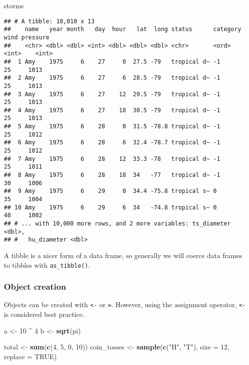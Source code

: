 \documentclass[
]{article}
\newenvironment{Shaded}{\begin{snugshade}}{\end{snugshade}}
\newcommand{\DataTypeTok}[1]{\textcolor[rgb]{0.13,0.29,0.53}{#1}}
\newcommand{\DecValTok}[1]{\textcolor[rgb]{0.00,0.00,0.81}{#1}}
\newcommand{\KeywordTok}[1]{\textcolor[rgb]{0.13,0.29,0.53}{\textbf{#1}}}
\newcommand{\NormalTok}[1]{#1}
\newcommand{\OperatorTok}[1]{\textcolor[rgb]{0.81,0.36,0.00}{\textbf{#1}}}
\newcommand{\OtherTok}[1]{\textcolor[rgb]{0.56,0.35,0.01}{#1}}
\newcommand{\StringTok}[1]{\textcolor[rgb]{0.31,0.60,0.02}{#1}}
\begin{document}
\begin{Shaded}
\begin{Highlighting}[]
\NormalTok{storms}
\end{Highlighting}
\end{Shaded}

\begin{verbatim}
## # A tibble: 10,010 x 13
##    name   year month   day  hour   lat  long status      category  wind pressure
##    <chr> <dbl> <dbl> <int> <dbl> <dbl> <dbl> <chr>       <ord>    <int>    <int>
##  1 Amy    1975     6    27     0  27.5 -79   tropical d~ -1          25     1013
##  2 Amy    1975     6    27     6  28.5 -79   tropical d~ -1          25     1013
##  3 Amy    1975     6    27    12  29.5 -79   tropical d~ -1          25     1013
##  4 Amy    1975     6    27    18  30.5 -79   tropical d~ -1          25     1013
##  5 Amy    1975     6    28     0  31.5 -78.8 tropical d~ -1          25     1012
##  6 Amy    1975     6    28     6  32.4 -78.7 tropical d~ -1          25     1012
##  7 Amy    1975     6    28    12  33.3 -78   tropical d~ -1          25     1011
##  8 Amy    1975     6    28    18  34   -77   tropical d~ -1          30     1006
##  9 Amy    1975     6    29     0  34.4 -75.8 tropical s~ 0           35     1004
## 10 Amy    1975     6    29     6  34   -74.8 tropical s~ 0           40     1002
## # ... with 10,000 more rows, and 2 more variables: ts_diameter <dbl>,
## #   hu_diameter <dbl>
\end{verbatim}

A tibble is a nicer form of a data frame, so generally we will coerce
data frames to tibbles with \texttt{as\_tibble()}.

\hypertarget{object-creation}{%
\subsubsection{Object creation}\label{object-creation}}

Objects can be created with \texttt{\textless{}-} or \texttt{=}.
However, using the assignment operator, \texttt{\textless{}-} is
considered best practice.

\begin{Shaded}
\begin{Highlighting}[]
\NormalTok{a <-}\StringTok{ }\DecValTok{10} \OperatorTok{^}\StringTok{ }\DecValTok{4}
\NormalTok{b <-}\StringTok{ }\KeywordTok{sqrt}\NormalTok{(pi)}

\NormalTok{total <-}\StringTok{ }\KeywordTok{sum}\NormalTok{(}\KeywordTok{c}\NormalTok{(}\DecValTok{4}\NormalTok{, }\DecValTok{5}\NormalTok{, }\DecValTok{0}\NormalTok{, }\DecValTok{10}\NormalTok{))}
\NormalTok{coin_tosses <-}\StringTok{ }\KeywordTok{sample}\NormalTok{(}\KeywordTok{c}\NormalTok{(}\StringTok{"H"}\NormalTok{, }\StringTok{"T"}\NormalTok{), }\DataTypeTok{size =} \DecValTok{12}\NormalTok{, }\DataTypeTok{replace =} \OtherTok{TRUE}\NormalTok{)}
\end{Highlighting}
\end{Shaded}
\end{document}

